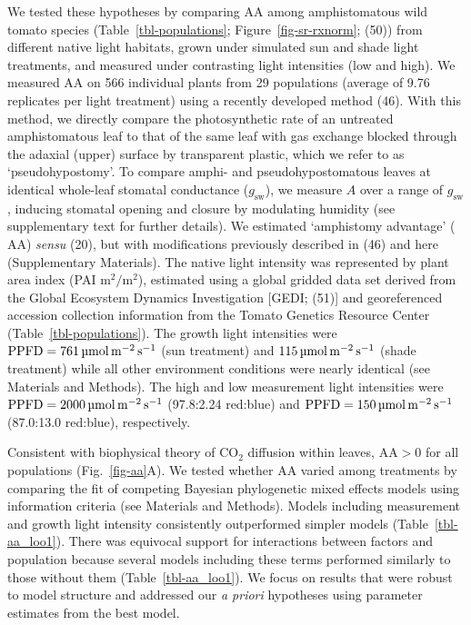 \documentclass[
  letterpaper,
  DIV=11,
  numbers=noendperiod]{scrartcl}
\newcommand{\aax}{$\mathrm{AA}$}
\newcommand{\aay}{\mathrm{AA}}
\newcommand{\gsw}{$g_\text{sw}$}
\newcommand{\ppfdequals}[1]{$\mathrm{PPFD} = \qty{#1}{\micro\mol\raiseto{-2}\meter\raiseto{-1}\second}$}
\newcommand{\ppfdqty}[1]{$\qty{#1}{\micro\mol\raiseto{-2}\meter\raiseto{-1}\second}$}
\begin{document}
\begin{linenumbers}
\begin{doublespace}
We tested these hypotheses by comparing \aax{} among amphistomatous wild
tomato species (Table~\ref{tbl-populations}; Figure~\ref{fig-sr-rxnorm};
(50)) from different native light habitats, grown under simulated sun
and shade light treatments, and measured under contrasting light
intensities (low and high). We measured \aax{} on 566 individual plants
from 29 populations (average of 9.76 replicates per light treatment)
using a recently developed method (46). With this method, we directly
compare the photosynthetic rate of an untreated amphistomatous leaf to
that of the same leaf with gas exchange blocked through the adaxial
(upper) surface by transparent plastic, which we refer to as
`pseudohypostomy'. To compare amphi- and pseudohypostomatous leaves at
identical whole-leaf stomatal conductance (\gsw), we measure \(A\) over
a range of \gsw, inducing stomatal opening and closure by modulating
humidity (see supplementary text for further details). We estimated
`amphistomy advantage' (\aax) \emph{sensu} (20), but with modifications
previously described in (46) and here (Supplementary Materials). The
native light intensity was represented by plant area index (PAI
\(\unit{\meter\squared\per\meter\squared}\)), estimated using a global
gridded data set derived from the Global Ecosystem Dynamics
Investigation {[}GEDI; (51){]} and georeferenced accession collection
information from the Tomato Genetics Resource Center
(Table~\ref{tbl-populations}). The growth light intensities were
\ppfdequals{761} (sun treatment) and \ppfdqty{115} (shade treatment)
while all other environment conditions were nearly identical (see
Materials and Methods). The high and low measurement light intensities
were \ppfdequals{2000} (97.8:2.24 red:blue) and \ppfdequals{150}
(87.0:13.0 red:blue), respectively.

Consistent with biophysical theory of CO\(_2\) diffusion within leaves,
\(\aay{} > 0\) for all populations (Fig.~\ref{fig-aa}A). We tested
whether \aax{} varied among treatments by comparing the fit of competing
Bayesian phylogenetic mixed effects models using information criteria
(see Materials and Methods). Models including measurement and growth
light intensity consistently outperformed simpler models
(Table~\ref{tbl-aa_loo1}). There was equivocal support for interactions
between factors and population because several models including these
terms performed similarly to those without them
(Table~\ref{tbl-aa_loo1}). We focus on results that were robust to model
structure and addressed our \emph{a priori} hypotheses using parameter
estimates from the best model.


\end{doublespace}
\end{linenumbers}
\end{document}
